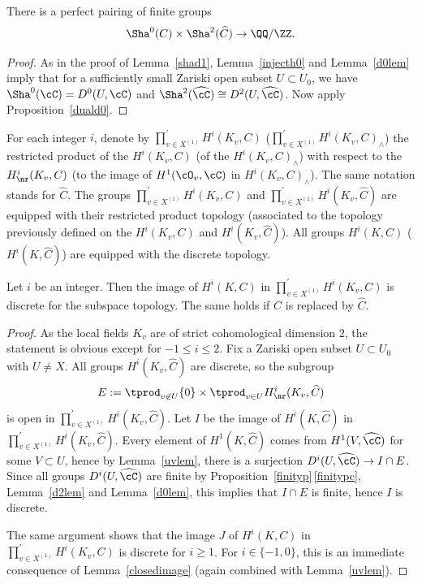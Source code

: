 \begin{theo} \label{sha0theo}
There is a perfect pairing of finite groups
\[
\Sha^0(C) \times \Sha^2(\widehat C) \to \QQ/\ZZ.
\]
\end{theo}

\begin{proof} As in the proof of Lemma~\ref{shad1}, Lemma~\ref{injecth0} and
Lemma~\ref{d0lem} imply that for a sufficiently small Zariski open subset
$U \subset U_0$, we have $\Sha^0(\cC)=D^0(U,\cC)$ and $\Sha^2(\widehat \cC) \cong
D^2(U,\widehat \cC)$. Now apply Proposition~\ref{duald0}.
\end{proof}

For each integer $i$, denote by $\prod^{\prime}_{v \in X^{(1)}}
H^i(K_v,C)$ (\resp $\prod^{\prime}_{v \in X^{(1)}}
H^i(K_v,C)_{\wedge}$)
the restricted product of the $H^i(K_v,C)$ (\resp of the $H^i(K_v,C)_{\wedge}$)
with respect
to the $H^i_{\nr}(K_v,C)$ (\resp to the image of $H^1(\cO_v,\cC)$ in
$H^i(K_v,C)_{\wedge}$). The same notation stands for $\widehat C$.
The groups $\prod^{\prime}_{v \in X^{(1)}} H^i(K_v,C)$ and
$\prod^{\prime}_{v \in X^{(1)}} H^i(K_v,\widehat C)$ are equipped with their
restricted product topology (associated to the topology previously
defined on the $H^i(K_v,C)$ and $H^i(K_v,\widehat C)$). All groups
$H^i(K,C)$ (\resp $H^i(K,\widehat C)$) are equipped with the discrete
topology.

\begin{lem} \label{discretlem}
Let $i$ be an integer. Then the image of $H^i(K,C)$
in $\prod^{\prime}_{v \in X^{(1)}} H^i(K_v,C)$ is discrete for the subspace
topology. The same holds if $C$ is replaced by $\widehat C$.
\end{lem}

\begin{proof} As the local fields $K_v$ are of strict cohomological dimension $2$,
the statement is obvious except for $-1 \leq i \leq 2$.
Fix a Zariski open subset $U \subset U_0$ with $U \neq X$.
All groups $H^i(K_v,\widehat C)$ are discrete, so the subgroup
\[
E:=\tprod_{v \not \in U} \{0\} \times \tprod_{v \in U}
H^i_{\nr}(K_v, \widehat C)
\]
is open in $\prod^{\prime}_{v \in X^{(1)}}
H^i(K_v,\widehat C)$. Let $I$ be the image of
$H^i(K,\widehat C)$ in $\prod^{\prime}_{v \in X^{(1)}} H^i(K_v,\widehat C)$.
Every element of $H^1(K,\widehat C)$ comes from
$H^1(V, \widehat \cC)$ for some $V \subset U$, hence by
Lemma~\ref{uvlem}, there is a surjection $D^i(U,\widehat \cC) \to I \cap E$.
Since all groups $D^i(U,\widehat \cC)$ are finite by
Proposition~\ref{finityp}\,\eqref{finitypc}, Lemma~\ref{d2lem} and Lemma~\ref{d0lem},
this implies that $I \cap E$ is finite, hence $I$ is discrete.

The same argument shows that the image $J$ of $H^i(K,C)$
in $\prod^{\prime}_{v \in X^{(1)}} H^i(K_v,C)$ is discrete for $i \geq 1$.
For $i \in \{-1, 0\}$,
this is an immediate consequence of Lemma~\ref{closedimage} (again combined
with Lemma~\ref{uvlem}).
\end{proof}


